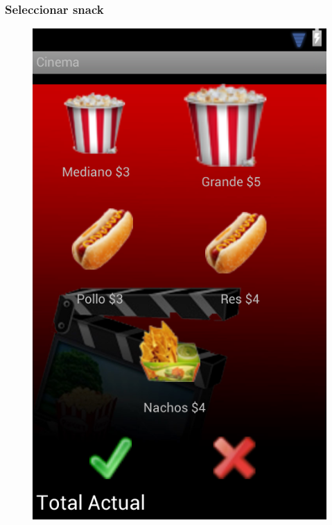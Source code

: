 \documentclass{beamer}
\begin{document}
\begin{frame}[allowframbreaks]
\frametitle{Seleccionar snack}
\begin{figure}[h]
\centering
\includegraphics[height=0.8\textheight]{canguil.png}
\end{figure}
\end{frame}
\end{document}
